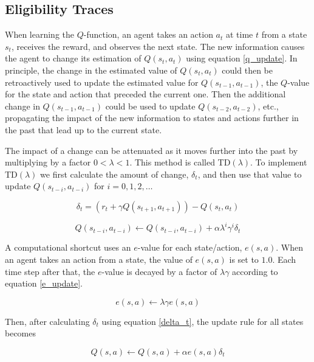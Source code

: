 \subsection{Eligibility Traces}
When learning the $Q$-function, an agent takes an action $a_t$ at time $t$ from a state $s_t$, receives the reward, and observes the next state.  The new information causes the agent to change its estimation of $Q(s_t, a_t)$ using equation \eqref{q_update}.  In principle, the change in the estimated value of $Q(s_t, a_t)$ could then be retroactively used to update the estimated value for $Q(s_{t-1}, a_{t-1})$, the $Q$-value for the state and action that preceded the current one.  Then the additional change in $Q(s_{t-1}, a_{t-1})$ could be used to update $Q(s_{t-2}, a_{t-2})$, etc., propagating the impact of the new information to states and actions further in the past that lead up to the current state.

The impact of a change can be attenuated as it moves further into the past by multiplying by a factor $0<\lambda < 1$.  This method is called TD$(\lambda)$.  To implement TD$(\lambda)$ we first calculate the amount of change, $\delta_t$, and then use that value to update $Q(s_{t-i}, a_{t-i})$ for $i=0,1,2,\dots$

\begin{equation}
\delta_t=\left(r_t+\gamma Q(s_{t+1}, a_{t+1})\right)-Q(s_t, a_t) \label{delta_t}
\end{equation}

\begin{equation}
Q(s_{t-i}, a_{t-i}) \gets Q(s_{t-i}, a_{t-i})+\alpha \lambda^i \gamma^i \delta_t \label{q_update2}
\end{equation}

A computational shortcut uses an $e$-value for each state/action, $e(s,a)$.  When an agent takes an action from a state, the value of $e(s,a)$ is set to $1.0$.  Each time step after that, the $e$-value is decayed by a factor of $\lambda \gamma$ according to equation \eqref{e_update}.

\begin{equation}
e(s,a) \gets \lambda \gamma e(s,a) \label{e_update}
\end{equation}

Then, after calculating $\delta_t$ using equation \eqref{delta_t}, the update rule for all states becomes

\begin{equation}
Q(s,a) \gets Q(s,a) + \alpha e(s,a) \delta_t \label{q_update3}
\end{equation}


